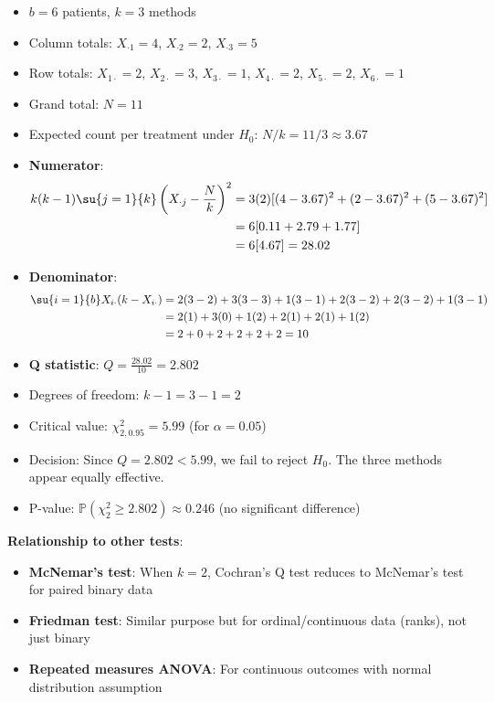 \begin{itemize}
    \item $b = 6$ patients, $k = 3$ methods
    \item Column totals: $X_{\cdot 1} = 4$, $X_{\cdot 2} = 2$, $X_{\cdot 3} = 5$
    \item Row totals: $X_{1\cdot} = 2$, $X_{2\cdot} = 3$, $X_{3\cdot} = 1$, $X_{4\cdot} = 2$, $X_{5\cdot} = 2$, $X_{6\cdot} = 1$
    \item Grand total: $N = 11$
    \item Expected count per treatment under $H_0$: $N/k = 11/3 \approx 3.67$

    \item \textbf{Numerator}:
    \begin{align*}
    k(k-1)\su{j=1}{k}\left(X_{\cdot j} - \frac{N}{k}\right)^2 &= 3(2)[(4-3.67)^2 + (2-3.67)^2 + (5-3.67)^2]\\
    &= 6[0.11 + 2.79 + 1.77]\\
    &= 6[4.67] = 28.02
    \end{align*}

    \item \textbf{Denominator}:
    \begin{align*}
    \su{i=1}{b}X_{i\cdot}(k-X_{i\cdot}) &= 2(3-2) + 3(3-3) + 1(3-1) + 2(3-2) + 2(3-2) + 1(3-1)\\
    &= 2(1) + 3(0) + 1(2) + 2(1) + 2(1) + 1(2)\\
    &= 2 + 0 + 2 + 2 + 2 + 2 = 10
    \end{align*}

    \item \textbf{Q statistic}: $Q = \frac{28.02}{10} = 2.802$

    \item Degrees of freedom: $k - 1 = 3 - 1 = 2$
    \item Critical value: $\chi^2_{2, 0.95} = 5.99$ (for $\alpha = 0.05$)
    \item Decision: Since $Q = 2.802 < 5.99$, we fail to reject $H_0$. The three methods appear equally effective.
    \item P-value: $\mathbb{P}(\chi^2_2 \geq 2.802) \approx 0.246$ (no significant difference)
\end{itemize}

\textbf{Relationship to other tests}:
\begin{itemize}
    \item \textbf{McNemar's test}: When $k=2$, Cochran's Q test reduces to McNemar's test for paired binary data
    \item \textbf{Friedman test}: Similar purpose but for ordinal/continuous data (ranks), not just binary
    \item \textbf{Repeated measures ANOVA}: For continuous outcomes with normal distribution assumption
\end{itemize}

